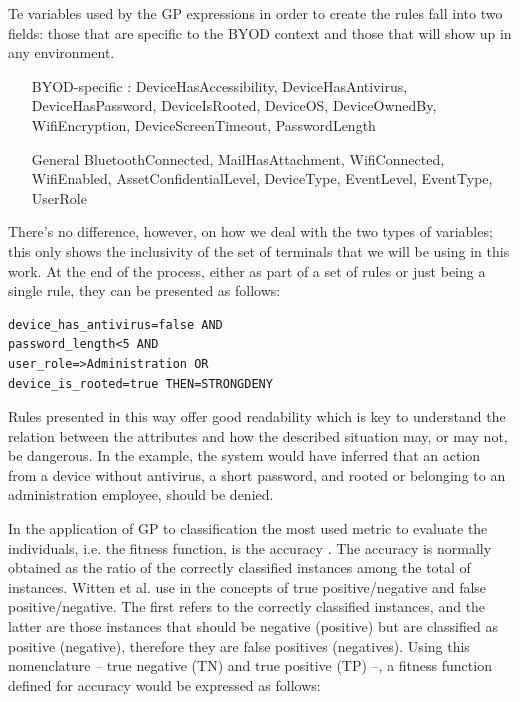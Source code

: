 \documentclass[runningheads]{llncs}
\begin{document}
Te variables used by the GP expressions in order to create the rules fall
into two fields: those that are specific to the BYOD context and those
that will show up in any environment.\begin{itemize}
  \item[BYOD-specific]: DeviceHasAccessibility, DeviceHasAntivirus,
    DeviceHasPassword, DeviceIsRooted, DeviceOS, DeviceOwnedBy,
    WifiEncryption, DeviceScreenTimeout, PasswordLength
  \item[General] BluetoothConnected, MailHasAttachment, WifiConnected, WifiEnabled,
    AssetConfidentialLevel, DeviceType, EventLevel, EventType, UserRole
  \end{itemize}

  There's no difference, however, on how we deal with the two types of
  variables; this only shows the inclusivity of the set of terminals
  that we will be using in this work. At the end of the process, either as part of a set of rules or just being a single rule, they can be presented as follows:

\begin{verbatim}
device_has_antivirus=false AND
password_length<5 AND
user_role=>Administration OR
device_is_rooted=true THEN=STRONGDENY
\end{verbatim}

Rules presented in this way offer good readability which is key to understand the relation between the attributes and how the described situation may, or may not, be dangerous. In the example, the system would have inferred that an action from a device without antivirus, a short password, and rooted or belonging to an administration employee, should be denied.

\label{subsec:chossingfitness}

In the application of GP to classification
the most used metric to evaluate the individuals, i.e. the fitness function, is the accuracy
\cite{espejo2010survey}. The accuracy is normally obtained as the
ratio of the correctly classified instances among the total of
instances. Witten et al. use in \cite{witten2005data} the
concepts of true positive/negative and false positive/negative. The
first refers to the correctly classified instances, and the latter are
those instances that should be negative (positive) but are classified
as positive (negative), therefore they are false positives
(negatives). Using this nomenclature -- true negative (TN) and true positive (TP) --, a fitness function defined for
accuracy would be expressed as follows: 
\end{document}
